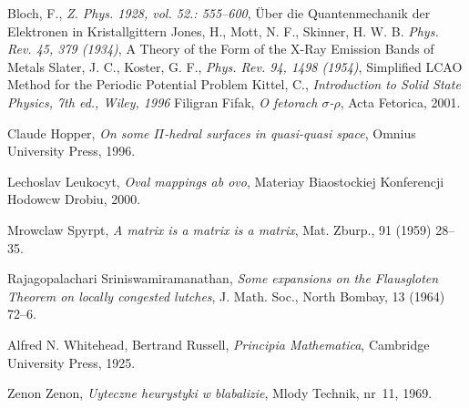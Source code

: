 \begin{thebibliography}{99}

 Bloch, F., \textit{Z. Phys. 1928, vol. 52.: 555–600}, Über die Quantenmechanik der Elektronen in Kristallgittern
 Jones, H., Mott, N. F.,  Skinner, H. W. B. \textit{Phys. Rev. 45, 379 (1934)}, A Theory of the Form of the X-Ray Emission Bands of Metals
 Slater, J. C., Koster, G. F., \textit{Phys. Rev. 94, 1498 (1954)}, Simplified LCAO Method for the Periodic Potential Problem
 Kittel, C., \textit{Introduction to Solid State Physics, 7th ed., Wiley, 1996} 
 Filigran Fifak, \textit{O fetorach
    $\sigma$-$\rho$}, Acta Fetorica, 2001.

 Claude Hopper, \textit{On some $\Pi$-hedral
    surfaces in quasi-quasi space}, Omnius University Press, 1996.

 Lechoslav Leukocyt, \textit{Oval mappings ab ovo},
  Materiay Biaostockiej Konferencji Hodowcw Drobiu, 2000.

 Mrowclaw Spyrpt, \textit{A matrix is a matrix
    is a matrix}, Mat. Zburp., 91 (1959) 28--35.

 Rajagopalachari Sriniswamiramanathan,
  \textit{Some expansions on the Flausgloten Theorem on locally
    congested lutches}, J. Math.  Soc., North Bombay, 13 (1964) 72--6.

 Alfred N. Whitehead, Bertrand Russell,
  \textit{Principia Mathematica}, Cambridge University Press, 1925.

 Zenon Zenon, \textit{Uyteczne heurystyki
    w blabalizie}, Mlody Technik, nr~11, 1969.

\end{thebibliography}
